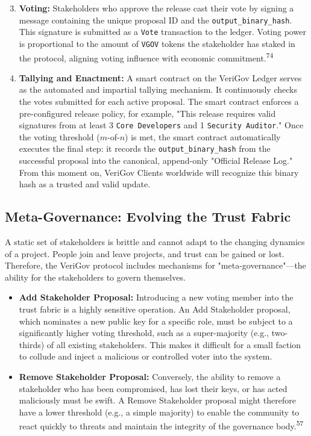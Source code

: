 \documentclass{article}
\begin{document}
\begin{enumerate}\setcounter{enumi}{2}
\item \textbf{Voting:} Stakeholders who approve the release cast their vote by signing a message containing the unique proposal ID and the \lstinline{output_binary_hash}. This signature is submitted as a \lstinline{Vote} transaction to the ledger. Voting power is proportional to the amount of \lstinline{VGOV} tokens the stakeholder has staked in the protocol, aligning voting influence with economic commitment.\textsuperscript{74}
\item \textbf{Tallying and Enactment:} A smart contract on the VeriGov Ledger serves as the automated and impartial tallying mechanism. It continuously checks the votes submitted for each active proposal. The smart contract enforces a pre-configured release policy, for example, "This release requires valid signatures from at least 3 \lstinline{Core Developers} and 1 \lstinline{Security Auditor}." Once the voting threshold ($m$-of-$n$) is met, the smart contract automatically executes the final step: it records the \lstinline{output_binary_hash} from the successful proposal into the canonical, append-only "Official Release Log." From this moment on, VeriGov Clients worldwide will recognize this binary hash as a trusted and valid update.
\end{enumerate}

\subsection{Meta-Governance: Evolving the Trust Fabric}

A static set of stakeholders is brittle and cannot adapt to the changing dynamics of a project. People join and leave projects, and trust can be gained or lost. Therefore, the VeriGov protocol includes mechanisms for "meta-governance"---the ability for the stakeholders to govern themselves.

\begin{itemize}
\item \textbf{Add Stakeholder Proposal:} Introducing a new voting member into the trust fabric is a highly sensitive operation. An Add Stakeholder proposal, which nominates a new public key for a specific role, must be subject to a significantly higher voting threshold, such as a super-majority (e.g., two-thirds) of all existing stakeholders. This makes it difficult for a small faction to collude and inject a malicious or controlled voter into the system.
\item \textbf{Remove Stakeholder Proposal:} Conversely, the ability to remove a stakeholder who has been compromised, has lost their keys, or has acted maliciously must be swift. A Remove Stakeholder proposal might therefore have a lower threshold (e.g., a simple majority) to enable the community to react quickly to threats and maintain the integrity of the governance body.\textsuperscript{57}
\end{itemize}
\end{document}
